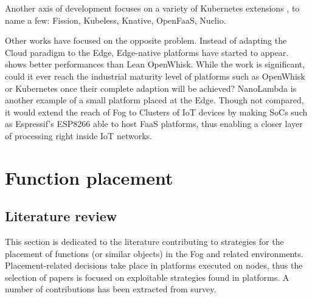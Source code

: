 Another axis of development focuses on a variety of Kubernetes extensions \cite{bocci_secure_2021}, to name a few: Fission, Kubeless, Knative, OpenFaaS, Nuclio.

Other works have focused on the opposite problem. Instead of adapting the Cloud paradigm to the Edge, Edge-native platforms have started to appear. \citet{pfandzelter_tinyfaas_2020} shows better performances than Lean OpenWhisk. While the work is significant, could it ever reach the industrial maturity level of platforms such as OpenWhisk or Kubernetes once their complete adaption will be achieved?  NanoLambda is another example of a small platform placed at the Edge. Though not compared, it would extend the reach of Fog to Clusters of IoT devices by making \glspl{SoC} such as Espressif's ESP8266 \cite{noauthor_esp8266_nodate} able to host \gls{FaaS} platforms, thus enabling a closer layer of processing right inside \gls{IoT} networks.

\section{Function placement}
\label{sec:placement}

\subsection{Literature review \label{sec:literature_review}}

This section is dedicated to the literature contributing to strategies for the placement of functions (or similar objects) in the Fog and related environments. Placement-related decisions take place in platforms executed on nodes, thus the selection of papers is focused on exploitable strategies found in platforms. A number of contributions has been extracted from  survey.

